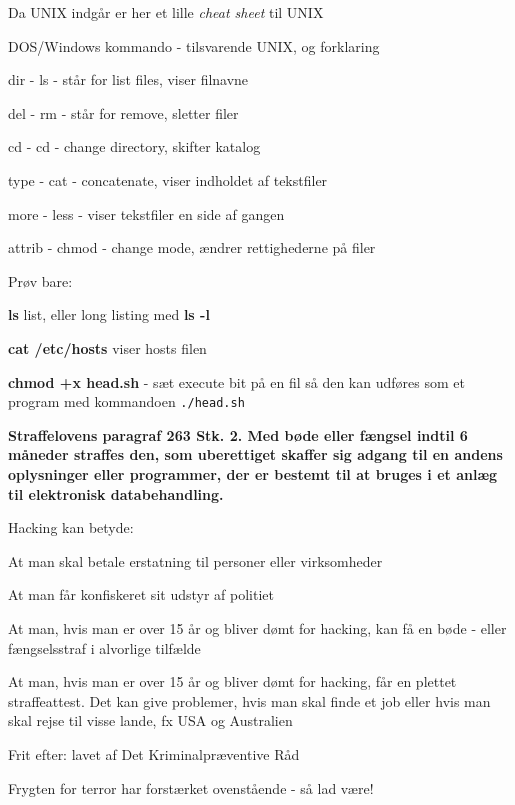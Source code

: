 \documentclass[Screen16to9,17pt]{foils}
\begin{document}
\begin{list1}
\item Da UNIX indgår er her et lille \emph{cheat sheet} til UNIX
\begin{list2}
\item DOS/Windows kommando - tilsvarende UNIX, og forklaring
\item dir - ls - står for list files, viser filnavne
\item del - rm - står for remove, sletter filer
\item cd - cd - change directory, skifter katalog
\item type - cat - concatenate, viser indholdet af tekstfiler
\item more - less - viser tekstfiler en side af gangen
\item attrib - chmod - change mode, ændrer rettighederne på filer
\end{list2}
\item Prøv bare:
  \begin{list2}
    \item {\bfseries ls} list, eller long listing med {\bfseries ls -l}
    \item {\bfseries cat /etc/hosts} viser hosts filen
\item {\bfseries chmod +x head.sh} - sæt execute bit på en fil så den
  kan udføres som et program med kommandoen \verb+./head.sh+
  \end{list2}
\end{list1}


{\bfseries Straffelovens paragraf 263 Stk. 2. Med bøde eller fængsel
  indtil 6 måneder
straffes den, som uberettiget skaffer sig adgang til en andens
oplysninger eller programmer, der er bestemt til at bruges i et anlæg
til elektronisk databehandling.}

Hacking kan betyde:
\begin{list2}
\item At man skal betale erstatning til personer eller virksomheder
\item At man får konfiskeret sit udstyr af politiet
\item At man, hvis man er over 15 år og bliver dømt for hacking, kan
  få en bøde - eller fængselsstraf i alvorlige tilfælde
\item At man, hvis man er over 15 år og bliver dømt for hacking, får
en plettet straffeattest. Det kan give problemer, hvis man skal finde
et job eller hvis man skal rejse til visse lande, fx USA og
Australien
\item Frit efter:  lavet af Det
  Kriminalpræventive Råd
\item Frygten for terror har forstærket ovenstående - så lad være!
\end{list2}
\end{document}
